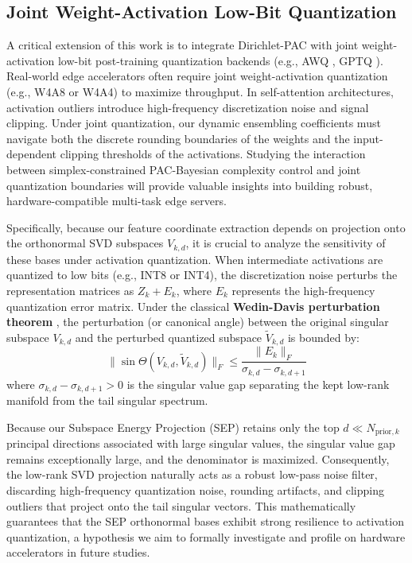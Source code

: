 \subsection{Joint Weight-Activation Low-Bit Quantization}
A critical extension of this work is to integrate Dirichlet-PAC with joint weight-activation low-bit post-training quantization backends (e.g., AWQ \cite{lin2023awq}, GPTQ \cite{frantar2022gptq}). Real-world edge accelerators often require joint weight-activation quantization (e.g., W4A8 or W4A4) to maximize throughput. In self-attention architectures, activation outliers introduce high-frequency discretization noise and signal clipping. Under joint quantization, our dynamic ensembling coefficients must navigate both the discrete rounding boundaries of the weights and the input-dependent clipping thresholds of the activations. Studying the interaction between simplex-constrained PAC-Bayesian complexity control and joint quantization boundaries will provide valuable insights into building robust, hardware-compatible multi-task edge servers.

Specifically, because our feature coordinate extraction depends on projection onto the orthonormal SVD subspaces $V_{k, d}$, it is crucial to analyze the sensitivity of these bases under activation quantization. When intermediate activations are quantized to low bits (e.g., INT8 or INT4), the discretization noise perturbs the representation matrices as $Z_k + E_k$, where $E_k$ represents the high-frequency quantization error matrix. Under the classical \textbf{Wedin-Davis perturbation theorem} \cite{stewart1990matrix}, the perturbation (or canonical angle) between the original singular subspace $V_{k, d}$ and the perturbed quantized subspace $\widetilde{V}_{k, d}$ is bounded by:
\begin{equation}
  \|\sin \Theta(V_{k, d}, \widetilde{V}_{k, d})\|_F \le \frac{\|E_k\|_F}{\sigma_{k, d} - \sigma_{k, d+1}}
\end{equation}
where $\sigma_{k, d} - \sigma_{k, d+1} > 0$ is the singular value gap separating the kept low-rank manifold from the tail singular spectrum. 

Because our Subspace Energy Projection (SEP) retains only the top $d \ll N_{\text{prior}, k}$ principal directions associated with large singular values, the singular value gap remains exceptionally large, and the denominator is maximized. Consequently, the low-rank SVD projection naturally acts as a robust low-pass noise filter, discarding high-frequency quantization noise, rounding artifacts, and clipping outliers that project onto the tail singular vectors. This mathematically guarantees that the SEP orthonormal bases exhibit strong resilience to activation quantization, a hypothesis we aim to formally investigate and profile on hardware accelerators in future studies.

